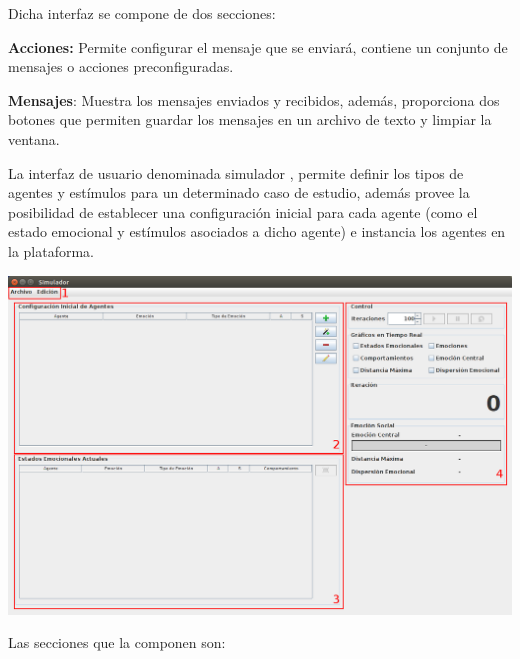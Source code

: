 Dicha interfaz se compone de dos secciones:

\begin{enumeracion}
	\item \textbf{Acciones:} Permite configurar el mensaje que se enviará, contiene un conjunto de mensajes o acciones
  preconfiguradas.
	\item \textbf{Mensajes}: Muestra los mensajes enviados y recibidos, además, proporciona dos botones
  que permiten guardar los mensajes en un archivo de texto y limpiar la ventana.
\end{enumeracion}


La interfaz de usuario denominada simulador ,
permite definir los tipos de agentes y estímulos para un determinado caso de estudio, además
provee la posibilidad de establecer una configuración inicial para cada agente
(como el estado emocional y estímulos asociados a dicho agente) e instancia los agentes en la plataforma.

\begin{ilustracion}[fuente=\yo, etiqueta=simulador, titulo={Interfaz Para la Configuración de Simulaciones}]
\includegraphics[width=14cm]{ilustraciones/interfaces/simulador-recuadros.png}
\end{ilustracion}

Las secciones que la componen son:

